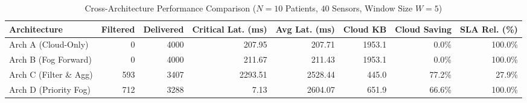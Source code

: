 
\begin{table}[t]
\centering
\caption{Cross-Architecture Performance Comparison ($N=10$ Patients, $40$ Sensors, Window Size $W=5$)}
\label{tab:arch_comparison}
\begin{tabular}{lrrrrrrr}
\toprule
\textbf{Architecture} & \textbf{Filtered} & \textbf{Delivered} & \textbf{Critical Lat. (ms)} & \textbf{Avg Lat. (ms)} & \textbf{Cloud KB} & \textbf{Cloud Saving} & \textbf{SLA Rel. (\%)} \\
\midrule
Arch A (Cloud-Only) & 0 & 4000 & 207.95 & 207.71 & 1953.1 & 0.0\% & 100.0\% \\
Arch B (Fog Forward) & 0 & 4000 & 211.67 & 211.43 & 1953.1 & 0.0\% & 100.0\% \\
Arch C (Filter \& Agg) & 593 & 3407 & 2293.51 & 2528.44 & 445.0 & 77.2\% & 27.9\% \\
Arch D (Priority Fog) & 712 & 3288 & 7.13 & 2604.07 & 651.9 & 66.6\% & 100.0\% \\
\bottomrule
\end{tabular}
\end{table}

